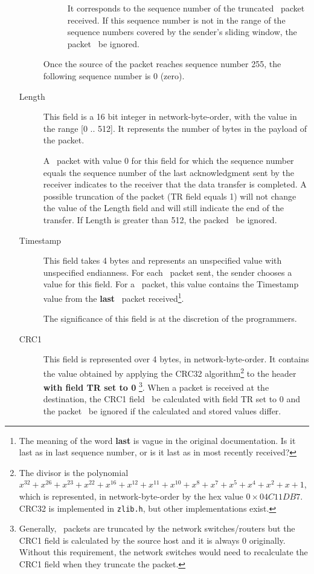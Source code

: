 \documentclass[12pt]{book}
\begin{document}
\begin{enumerate}[label=\arabic*.]
\begin{description}
\begin{description}
            \item[\pnack] It corresponds to the sequence number of the truncated \pdata\ packet received. If this sequence number is not in the range of the sequence numbers covered by the sender's sliding window, the packet \must\ be ignored.
        \end{description}

         Once the source of the packet reaches sequence number 255, the following sequence number is 0 (zero).

    \item[Length] This field is a 16 bit integer in network-byte-order, with the value in the range [0 .. 512]. It represents the number of bytes in the payload of the packet.

    A \pdata\ packet with value 0 for this field for which the sequence number equals the sequence number of the last acknowledgment sent  by the receiver indicates to the receiver that the data transfer is completed. A possible truncation of the packet (TR field equals 1) will not change the value of the Length field and will still indicate the end of the transfer. If Length is greater than 512, the packed \must\ be ignored.

    \item[Timestamp] This field takes 4 bytes and represents an unspecified value with unspecified endianness. For each \pdata\ packet sent, the sender chooses a value for this field. For a \pack\ packet, this value contains the Timestamp value from the \textbf{last} \pdata\ packet received\footnote{The meaning of the word \textbf{last} is vague in the original documentation. Is it last as in last sequence number, or is it last as in most recently received?}.

    The significance of this field is at the discretion of the programmers.

    \item[CRC1] This field is represented over 4 bytes, in network-byte-order. It contains the value obtained by applying the CRC32 algorithm\footnote{The divisor is the polynomial $x^{32} + x^{26} + x^{23} + x^{22} + x^{16} + x^{12} + x^{11} + x^{10} + x^8 + x^7 + x^5 + x^4 + x^2 + x + 1$, which is represented, in network-byte-order by the hex value $0\times04C11DB7$. CRC32 is implemented in \texttt{zlib.h}, but other implementations exist.
    } to the header \textbf{with field TR set to 0} \footnote{Generally, \pdata\ packets are truncated by the network switches/routers but the CRC1 field is calculated by the source host and it is always 0 originally. Without this requirement, the network switches would need to recalculate the CRC1 field when they truncate the packet.}. When a packet is received at the destination, the CRC1 field \must\ be calculated with field TR set to 0 and the packet \must\ be ignored if the calculated and stored values differ.


\end{description}
\end{enumerate}
\end{document}
